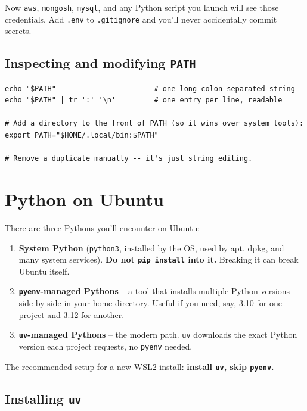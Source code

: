 \documentclass[11pt,a4paper]{article}
\begin{document}
Now \texttt{aws}, \texttt{mongosh}, \texttt{mysql}, and any Python
script you launch will see those credentials. Add \texttt{.env} to
\texttt{.gitignore} and you'll never accidentally commit secrets.

\subsection*{Inspecting and modifying \texttt{PATH}}

\begin{lstlisting}[style=bashstyle]
echo "$PATH"                       # one long colon-separated string
echo "$PATH" | tr ':' '\n'         # one entry per line, readable

# Add a directory to the front of PATH (so it wins over system tools):
export PATH="$HOME/.local/bin:$PATH"

# Remove a duplicate manually -- it's just string editing.
\end{lstlisting}

\section{Python on Ubuntu}

There are three Pythons you'll encounter on Ubuntu:

\begin{enumerate}[leftmargin=*]
\item \textbf{System Python} (\texttt{python3}, installed by the OS,
used by apt, dpkg, and many system services). \textbf{Do not \texttt{pip
install} into it.} Breaking it can break Ubuntu itself.
\item \textbf{\texttt{pyenv}-managed Pythons} -- a tool that installs
multiple Python versions side-by-side in your home directory. Useful
if you need, say, 3.10 for one project and 3.12 for another.
\item \textbf{\texttt{uv}-managed Pythons} -- the modern path. \texttt{uv}
downloads the exact Python version each project requests, no
\texttt{pyenv} needed.
\end{enumerate}

The recommended setup for a new WSL2 install: \textbf{install
\texttt{uv}, skip \texttt{pyenv}.}

\subsection*{Installing \texttt{uv}}
\end{document}
